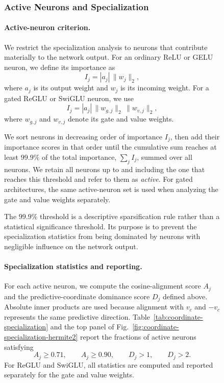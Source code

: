 \documentclass{article}
\begin{document}
\begin{figure}
\clearpage

\subsubsection{Active Neurons and Specialization}
\label{app:shared-specialization-analysis}

\paragraph{Active-neuron criterion.}
We restrict the specialization analysis to neurons that contribute materially
to the network output. For an ordinary ReLU or GELU neuron, we define its
importance as
\[
    I_j=|a_j|\,\|w_j\|_2,
\]
where \(a_j\) is its output weight and \(w_j\) is its incoming weight. For a
gated ReGLU or SwiGLU neuron, we use
\[
    I_j=|a_j|\,\|w_{g,j}\|_2\,\|w_{v,j}\|_2,
\]
where \(w_{g,j}\) and \(w_{v,j}\) denote its gate and value weights.

We sort neurons in decreasing order of importance \(I_j\), then add their
importance scores in that order until the cumulative sum reaches at least
\(99.9\%\) of the total importance, \(\sum_j I_j\), summed over all neurons.
We retain all neurons up to and including the one that reaches this threshold
and refer to them as \emph{active}. For gated architectures, the same active-neuron set is used
when analyzing the gate and value weights separately.

The \(99.9\%\) threshold is a descriptive sparsification rule rather than a
statistical significance threshold. Its purpose is to prevent the
specialization statistics from being dominated by neurons with negligible
influence on the network output.

\paragraph{Specialization statistics and reporting.}
For each active neuron, we compute the cosine-alignment score \(A_j\) and the
predictive-coordinate dominance score \(D_j\) defined above. Absolute inner
products are used because alignment with \(v_c\) and \(-v_c\) represents the
same predictive direction. Table~\ref{tab:coordinate-specialization} and the
top panel of Fig.~\ref{fig:coordinate-specialization-hermite2} report the
fractions of active neurons satisfying
\[
    A_j\geq0.71,\qquad
    A_j\geq0.90,\qquad
    D_j>1,\qquad
    D_j>2.
\]
For ReGLU and SwiGLU, all statistics are computed and reported separately for
the gate and value weights.


\end{figure}
\end{document}
